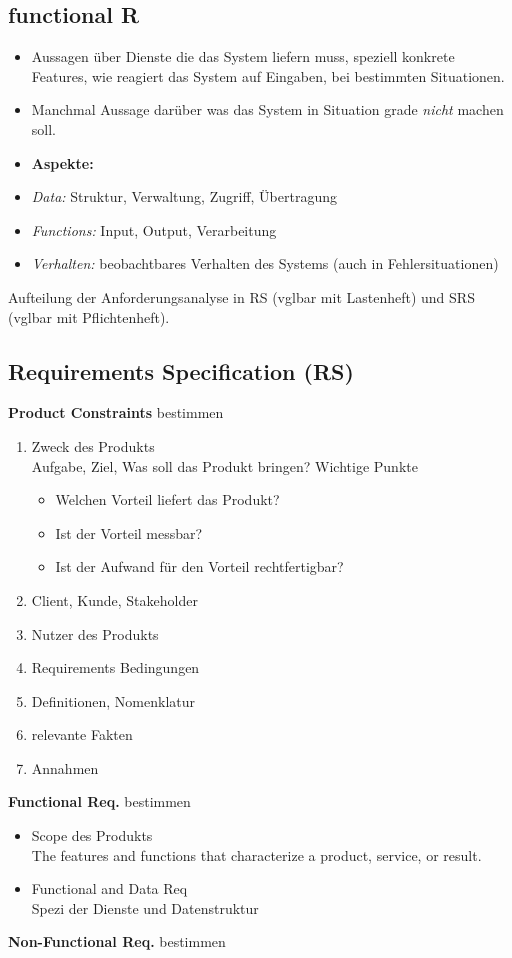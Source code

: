 \subsection{functional R}
\begin{itemize}
	\item Aussagen über Dienste die das System liefern muss, speziell konkrete Features, wie reagiert das System auf Eingaben, bei bestimmten Situationen.
	\item Manchmal Aussage darüber was das System in Situation grade \textit{nicht} machen soll.
	\item \textbf{Aspekte:}
	\item \textit{Data:} Struktur, Verwaltung, Zugriff, Übertragung
	\item \textit{Functions:} Input, Output, Verarbeitung
	\item \textit{Verhalten:} beobachtbares Verhalten des Systems (auch in Fehlersituationen)
\end{itemize}

Aufteilung der Anforderungsanalyse in RS (vglbar mit Lastenheft) und SRS (vglbar mit Pflichtenheft).

\subsection{Requirements Specification (RS)}
\textbf{Product Constraints} bestimmen
\begin{enumerate}
	\item Zweck des Produkts\\
	Aufgabe, Ziel, Was soll das Produkt bringen? Wichtige Punkte
	\begin{itemize}
		\item Welchen Vorteil liefert das Produkt?
		\item Ist der Vorteil messbar?
		\item Ist der Aufwand für den Vorteil rechtfertigbar?
	\end{itemize}
	\item Client, Kunde, Stakeholder
	\item Nutzer des Produkts
	\item Requirements Bedingungen
	\item Definitionen, Nomenklatur
	\item relevante Fakten
	\item Annahmen
\end{enumerate}
\textbf{Functional Req.} bestimmen
\begin{itemize}
	\item Scope des Produkts\\
	The features and functions that characterize a product, service, or result.
	\item Functional and Data Req\\
	Spezi der Dienste und Datenstruktur
\end{itemize}
\textbf{Non-Functional Req.} bestimmen


